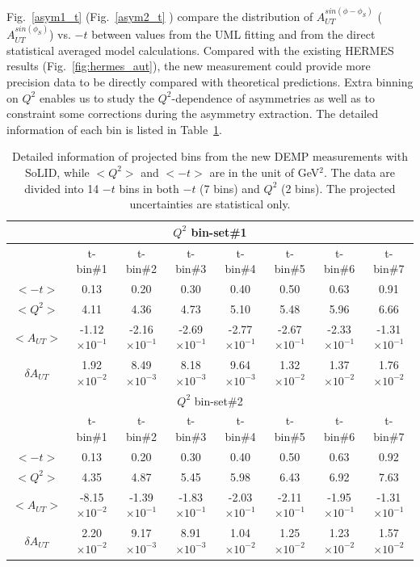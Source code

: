 Fig.~\ref{asym1_t} (Fig.~\ref{asym2_t} ) compare the distribution of $A_{UT}^{sin(\phi-\phi_{S})} $ ($A_{UT}^{sin(\phi_{S})}$) vs. $-t$ between values from the UML fitting and from the direct statistical averaged model calculations. 
Compared with the existing HERMES results
(Fig.~\ref{fig:hermes_aut}), the new measurement could provide more precision
data to be directly compared with theoretical predictions. Extra binning on
$Q^{2}$ enables us to study the $Q^{2}$-dependence of asymmetries as well as to
constraint some corrections during the asymmetry extraction.  The detailed
information of each bin is listed in Table~\ref{asym_bin_table}.  
\begin{table}[!ht]
\centering
 \small
\begin{tabular}{|c|c|c|c|c|c|c|c|}
\hline
 \multicolumn{8}{|c|}{$Q^{2}$ bin-set\#1 } \\
\hline
      &  t-bin\#1 & t-bin\#2 & t-bin\#3 & t-bin\#4 & t-bin\#5 & t-bin\#6 & t-bin\#7 \\
  \hline
$<-t>$    &  0.13 &  0.20 & 0.30 & 0.40 & 0.50 & 0.63 & 0.91 \\
$<Q^{2}>$   &  4.11 &  4.36 & 4.73 & 5.10 & 5.48 & 5.96 & 6.66 \\
$<A_{UT}>$ &  -1.12$\times 10^{-1}$ &  -2.16$\times 10^{-1}$ & -2.69$\times 10^{-1}$ & -2.77$\times 10^{-1}$ & -2.67$\times 10^{-1}$ & -2.33$\times 10^{-1}$ & -1.31$\times 10^{-1}$ \\
$\delta A_{UT}$  &  1.92$\times 10^{-2}$ &  8.49$\times 10^{-3}$ & 8.18$\times 10^{-3}$ & 9.64$\times 10^{-3}$ & 1.32$\times 10^{-2}$ & 1.37$\times 10^{-2}$ & 1.76$\times 10^{-2}$ \\
\hline

\multicolumn{8}{|c|}{$Q^{2}$ bin-set\#2 } \\
\hline
      &  t-bin\#1 & t-bin\#2 & t-bin\#3 & t-bin\#4 & t-bin\#5 & t-bin\#6 & t-bin\#7 \\
  \hline
$<-t>$     &  0.13 &  0.20 & 0.30 & 0.40 & 0.50 & 0.63 & 0.92 \\
$<Q^{2}>$   &  4.35 &  4.87 & 5.45 & 5.98 & 6.43 & 6.92 & 7.63 \\
$<A_{UT}>$   &  -8.15$\times 10^{-2}$ &  -1.39$\times 10^{-1}$ & -1.83$\times 10^{-1}$ & -2.03$\times 10^{-1}$ & -2.11$\times 10^{-1}$ & -1.95$\times 10^{-1}$ & -1.31$\times 10^{-1}$ \\
$\delta A_{UT}$   &  2.20$\times 10^{-2}$ &  9.17$\times 10^{-3}$ & 8.91$\times 10^{-3}$ & 1.04$\times 10^{-2}$ & 1.25$\times 10^{-2}$ & 1.23$\times 10^{-2}$ & 1.57$\times 10^{-2}$ \\
\hline
\end{tabular}
\caption[Detailed information of projected bins]{\footnotesize{Detailed
information of projected bins from the new DEMP measurements with SoLID, while
$<Q^{2}>$ and $<-t>$ are in the unit of GeV$^{2}$. The data are
divided into 14 $-t$ bins in both $-t$ (7 bins) and $Q^{2}$ (2 bins).  The
projected uncertainties are statistical only.}}
\label{asym_bin_table}
\end{table} 

